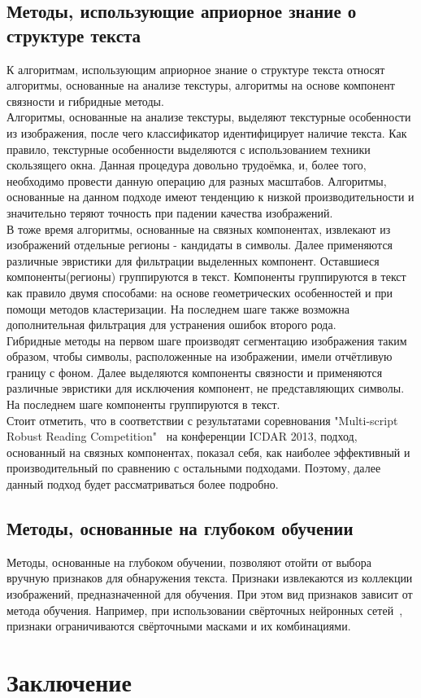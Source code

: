 \documentclass{matmex-diploma-custom}
\begin{document}
\subsection{Методы, использующие априорное знание о структуре текста}
\indent К алгоритмам, использующим априорное знание о структуре текста относят алгоритмы, основанные на анализе текстуры, алгоритмы на основе компонент связности и гибридные методы.\\
\indent Алгоритмы, основанные на анализе текстуры, выделяют текстурные особенности из изображения, после чего классификатор идентифицирует наличие текста. Как правило, текстурные особенности выделяются с использованием техники скользящего окна. Данная процедура довольно трудоёмка, и, более того, необходимо провести данную операцию для разных масштабов. Алгоритмы, основанные на данном подходе имеют тенденцию к низкой производительности и значительно теряют точность при падении качества изображений.\\
\indent В тоже время алгоритмы, основанные на связных компонентах, извлекают из изображений отдельные регионы - кандидаты в символы. Далее применяются различные эвристики для фильтрации выделенных компонент. Оставшиеся компоненты(регионы) группируются в текст. Компоненты группируются в текст как правило двумя способами: на основе геометрических особенностей и при помощи методов кластеризации. На последнем шаге также возможна дополнительная фильтрация для устранения ошибок второго рода.\\
\indent Гибридные методы на первом шаге производят сегментацию изображения таким образом, чтобы символы, расположенные на изображении, имели отчётливую границу с фоном. Далее выделяются компоненты связности и применяются различные эвристики для исключения компонент, не представляющих символы. На последнем шаге компоненты группируются в текст.\\
\indent Стоит отметить, что в соответствии с результатами соревнования "Multi-script Robust Reading Competition"~\cite{icdar2013} на конференции ICDAR 2013, подход, основанный на связных компонентах, показал себя, как наиболее эффективный и производительный по сравнению с остальными подходами. Поэтому, далее данный подход будет рассматриваться более подробно.
\subsection{Методы, основанные на глубоком обучении}
\indent Методы, основанные на глубоком обучении, позволяют отойти от выбора вручную признаков для обнаружения текста. Признаки извлекаются из коллекции изображений, предназначенной для обучения. При этом вид признаков зависит от метода обучения. Например, при использовании свёрточных нейронных сетей~\cite{lecun}, признаки ограничиваются свёрточными масками и их комбинациями.\\
\section*{Заключение}



\end{document}
